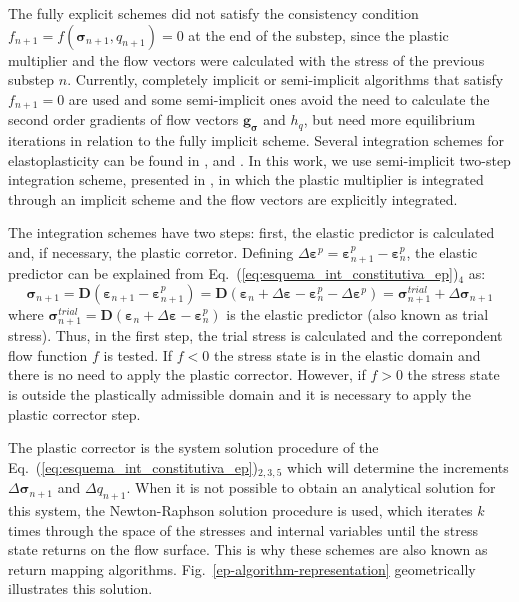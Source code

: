 \documentclass[Journal,letterpaper]{ascelike-new}
\newcommand{\dgds}{\boldsymbol{g_\sigma}}
\newcommand{\Dsdee}{\boldsymbol{D}}
\newcommand{\hl}{{h_q}}
\newcommand{\strain}{\boldsymbol{\varepsilon}}
\newcommand{\strainp}{\boldsymbol{\varepsilon}^{p}}
\newcommand{\stress}{\boldsymbol{\sigma}}
\begin{document}
The fully explicit schemes did not satisfy the consistency condition $f_{n+1}=f(\stress_{n+1},q_{n+1})=0$ at the end of the substep, since the plastic multiplier and the flow vectors were calculated with the stress of the previous substep $n$. Currently, completely implicit or semi-implicit algorithms that satisfy $f_{n+1} = 0$ are used and some semi-implicit ones avoid the need to calculate the second order gradients of flow vectors $\dgds$ and $\hl$, but need more equilibrium iterations in relation to the fully implicit scheme. Several integration schemes for elastoplasticity can be found in ,  and . In this work, we use semi-implicit two-step integration scheme, presented in , in which the plastic multiplier is integrated through an implicit scheme and the flow vectors are explicitly integrated.

The integration schemes have two steps: first, the elastic predictor is calculated and, if necessary, the plastic corretor. Defining  $\Delta \strainp = \strainp_{n+1} - \strainp_{n}$, the elastic predictor can be explained from Eq.~(\ref{eq:esquema_int_constitutiva_ep})$_4$ as: 
\begin{equation}
	\label{eq:preditor_elastico}
	\stress_{n+1} = \Dsdee(\strain_{n+1}-\strain_{n+1}^p) = \Dsdee(\strain_n+\Delta \strain-\strain_{n}^ p-\Delta \strain^p) = \stress_{n+1}^{trial} + \Delta \stress_{n+1}
\end{equation}
where $\stress_{n+1}^{trial} = \Dsdee (\strain_n+\Delta \strain-\strain_{n}^ p)$ is the elastic predictor (also known as trial stress). Thus, in the first step, the trial stress is calculated and the correpondent flow function $f$ is tested. If  $f<0$  the stress state is in the elastic domain and there is no need to apply the plastic corrector. However, if $f>0$ the stress state is outside the plastically admissible domain and it is necessary to apply the plastic corrector step.

The plastic corrector is the system solution procedure of the Eq.~(\ref{eq:esquema_int_constitutiva_ep})$_{2,3,5}$ which will determine the increments $\Delta \stress_{n+1}$ and $\Delta q_{n+1}$. When it is not possible to obtain an analytical solution for this system, the Newton-Raphson solution procedure is used, which iterates $k$ times through the space of the stresses and internal variables until the stress state returns on the flow surface. This is why these schemes are also known as return mapping algorithms. Fig.~\ref{ep-algorithm-representation} geometrically illustrates this solution.
\end{document}
